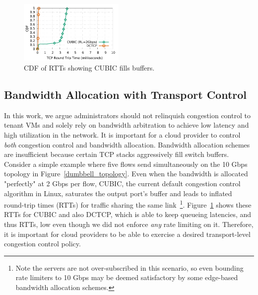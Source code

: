 
\begin{figure}[!t]
        \centering
  \includegraphics[width=0.45\textwidth]{figures/motivation/motivation_2Gbps_cubic_rl_dctcp_sockperf.pdf}
        \caption{CDF of RTTs showing CUBIC fills buffers.}
        \label{cubic-fill}
\end{figure}



\subsection{Bandwidth Allocation with Transport Control}
In this work, we argue administrators should not relinquish
congestion control to tenant VMs and solely rely on bandwidth arbitration
to achieve low latency and high utilization in the network. It is important for a
cloud provider to control {\em both} congestion control and bandwidth allocation.
Bandwidth allocation schemes are insufficient because certain TCP stacks aggressively
fill switch buffers. Consider a simple example where five flows send simultaneously
on the 10 Gbps topology in Figure~\ref{dumbbell_topology}. Even when the bandwidth is allocated "perfectly"
at 2 Gbps per flow, CUBIC, the current default congestion control algorithm
in Linux, saturates the output port's buffer and leads to inflated round-trip times (RTTs) for traffic
sharing the same link~\footnote{Note the servers are not over-subscribed in this scenario, so even
bounding rate limiters to 10 Gbps may be deemed satisfactory by some edge-based bandwidth allocation schemes.}. 
Figure~\ref{cubic-fill} shows these RTTs for CUBIC and also DCTCP, 
which is able to keep queueing latencies, and thus RTTs, low even though we did not enforce
{\em any} rate limiting on it. 
Therefore, it is important for cloud providers to be able to exercise a desired transport-level congestion
control policy. 


